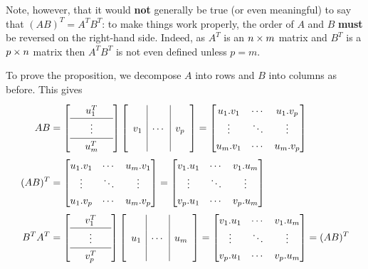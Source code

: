\documentclass[reqno]{amsart}
\theoremstyle{definition}
\begin{document}
Note, however, that it would \textbf{not} generally be true (or even
meaningful) to say that $(AB)^T=A^TB^T$: to make things work properly,
the order of $A$ and $B$ \textbf{must} be reversed on the right-hand
side.  Indeed, as $A^T$ is an $n\times m$ matrix and $B^T$ is a $p\times n$
matrix then $A^TB^T$ is not even defined unless $p=m$.

To prove the proposition, we decompose $A$ into rows and $B$ into
columns as before.  This gives
\begin{align*}
  AB &= {\renewcommand{\arraystretch}{1.3}
         \left[\begin{array}{ccc}
         & u_1^T & \\ \hline
         & \vdots & \\ \hline
         & u_m^T &
        \end{array}\right]}
        \left[\begin{array}{c|c|c}
         && \\ v_1 & \dotsb & v_p \\ &&
        \end{array}\right]
      = \bbm
          u_1.v_1 & \cdots & u_1.v_p \\
          \vdots  & \ddots & \vdots \\
          u_m.v_1 & \cdots & u_m.v_p
        \ebm \\
  (AB)^T &=
        \bbm
          u_1.v_1 & \cdots & u_m.v_1 \\
          \vdots  & \ddots & \vdots \\
          u_1.v_p & \cdots & u_m.v_p
        \ebm =
        \bbm
          v_1.u_1 & \cdots & v_1.u_m \\
          \vdots  & \ddots & \vdots \\
          v_p.u_1 & \cdots & v_p.u_m
        \ebm \\
  B^TA^T &=
        {\renewcommand{\arraystretch}{1.3}
         \left[\begin{array}{ccc}
         & v_1^T & \\ \hline
         & \vdots & \\ \hline
         & v_p^T &
        \end{array}\right]}
        \left[\begin{array}{c|c|c}
         && \\ u_1 & \dotsb & u_m \\ &&
        \end{array}\right] =
        \bbm
          v_1.u_1 & \cdots & v_1.u_m \\
          \vdots  & \ddots & \vdots \\
          v_p.u_1 & \cdots & v_p.u_m
        \ebm = (AB)^T
\end{align*}
\end{document}
